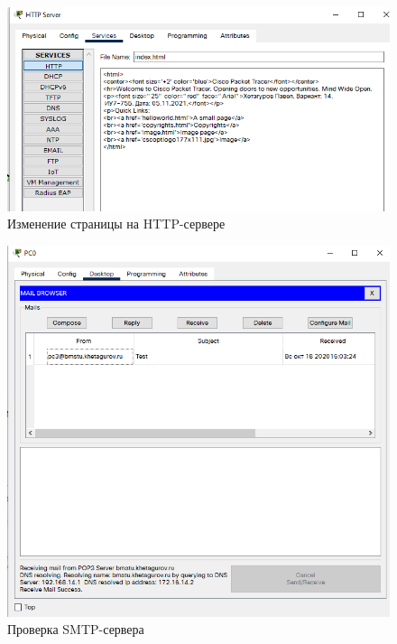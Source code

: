 \documentclass[12pt, a4paper]{extarticle}
\begin{document}
\begin{figure}[H]
	\centering
	\includegraphics[scale=0.7]{images/http.png}
	\caption{Изменение страницы на HTTP-сервере}
\end{figure}

\begin{figure}[H]
	\centering
	\includegraphics[scale=0.7]{images/smtp-check.png}
	\caption{Проверка SMTP-сервера}
\end{figure}
\end{document}
